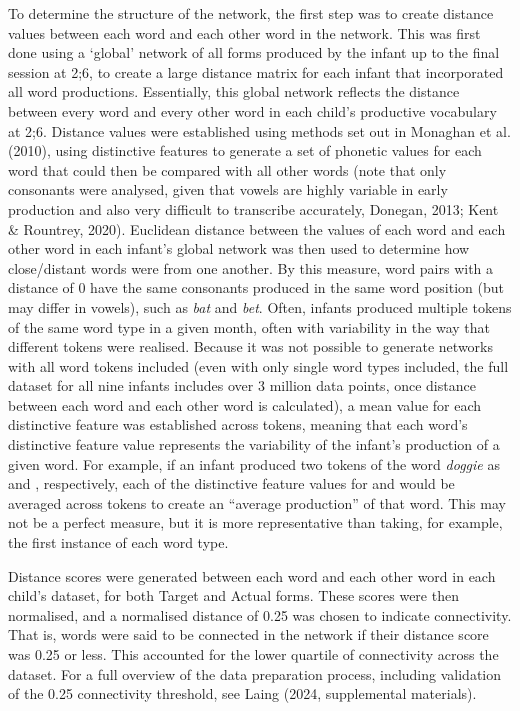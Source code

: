 \documentclass[
  man]{apa6}
\begin{document}
To determine the structure of the network, the first step was to create distance values between each word and each other word in the network. This was first done using a `global' network of all forms produced by the infant up to the final session at 2;6, to create a large distance matrix for each infant that incorporated all word productions. Essentially, this global network reflects the distance between every word and every other word in each child's productive vocabulary at 2;6. Distance values were established using methods set out in Monaghan et al. (2010), using distinctive features to generate a set of phonetic values for each word that could then be compared with all other words (note that only consonants were analysed, given that vowels are highly variable in early production and also very difficult to transcribe accurately, Donegan, 2013; Kent \& Rountrey, 2020). Euclidean distance between the values of each word and each other word in each infant's global network was then used to determine how close/distant words were from one another. By this measure, word pairs with a distance of 0 have the same consonants produced in the same word position (but may differ in vowels), such as \emph{bat} and \emph{bet}. Often, infants produced multiple tokens of the same word type in a given month, often with variability in the way that different tokens were realised. Because it was not possible to generate networks with all word tokens included (even with only single word types included, the full dataset for all nine infants includes over 3 million data points, once distance between each word and each other word is calculated), a mean value for each distinctive feature was established across tokens, meaning that each word's distinctive feature value represents the variability of the infant's production of a given word. For example, if an infant produced two tokens of the word \emph{doggie} as \textipa{[dAgi]} and \textipa{[dAti]}, respectively, each of the distinctive feature values for  and  would be averaged across tokens to create an ``average production'' of that word. This may not be a perfect measure, but it is more representative than taking, for example, the first instance of each word type.

Distance scores were generated between each word and each other word in each child's dataset, for both Target and Actual forms. These scores were then normalised, and a normalised distance of 0.25 was chosen to indicate connectivity. That is, words were said to be connected in the network if their distance score was 0.25 or less. This accounted for the lower quartile of connectivity across the dataset. For a full overview of the data preparation process, including validation of the 0.25 connectivity threshold, see Laing (2024, supplemental materials).
\end{document}

